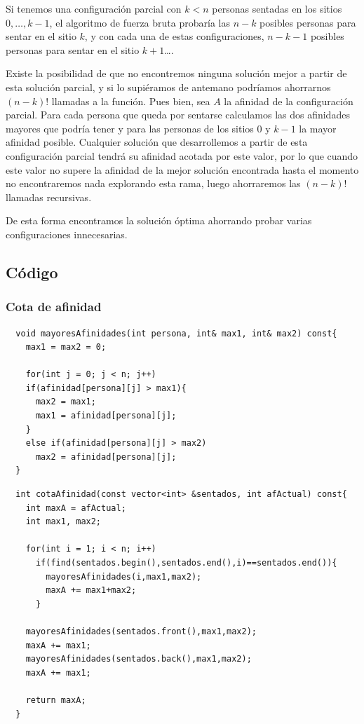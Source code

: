 \documentclass[a4]{article}
\begin{document}
Si tenemos una configuración parcial con $k < n$ personas sentadas en
los sitios $0,\ldots,k-1$, el algoritmo de fuerza bruta probaría las
$n-k$ posibles personas para sentar en el sitio $k$, y con cada una de
estas configuraciones, $n-k-1$ posibles personas para sentar en el
sitio $k+1$\ldots.

Existe la posibilidad de que no encontremos ninguna solución mejor a
partir de esta solución parcial, y si lo supiéramos de antemano
podríamos ahorrarnos $(n-k)!$ llamadas a la función. Pues bien, sea
$A$ la afinidad de la configuración parcial. Para cada persona que
queda por sentarse calculamos las dos afinidades mayores que podría
tener y para las personas de los sitios 0 y $k-1$ la mayor afinidad
posible. Cualquier solución que desarrollemos a partir de esta
configuración parcial tendrá su afinidad acotada por este valor, por
lo que cuando este valor no supere la afinidad de la mejor solución
encontrada hasta el momento no encontraremos nada explorando esta
rama, luego ahorraremos las $(n-k)!$ llamadas recursivas.

De esta forma encontramos la solución óptima ahorrando probar varias
configuraciones innecesarias.

\subsection{Código}

\subsubsection{Cota de afinidad}

\begin{lstlisting}
  void mayoresAfinidades(int persona, int& max1, int& max2) const{
    max1 = max2 = 0;

    for(int j = 0; j < n; j++)
    if(afinidad[persona][j] > max1){
      max2 = max1;
      max1 = afinidad[persona][j];
    }
    else if(afinidad[persona][j] > max2)
      max2 = afinidad[persona][j];
  }
\end{lstlisting}
\begin{lstlisting}
  int cotaAfinidad(const vector<int> &sentados, int afActual) const{
    int maxA = afActual;
    int max1, max2;

    for(int i = 1; i < n; i++)
      if(find(sentados.begin(),sentados.end(),i)==sentados.end()){
        mayoresAfinidades(i,max1,max2);
        maxA += max1+max2; 
      }
   
    mayoresAfinidades(sentados.front(),max1,max2);
    maxA += max1;
    mayoresAfinidades(sentados.back(),max1,max2);
    maxA += max1;

    return maxA;
  }
\end{lstlisting}
\end{document}
